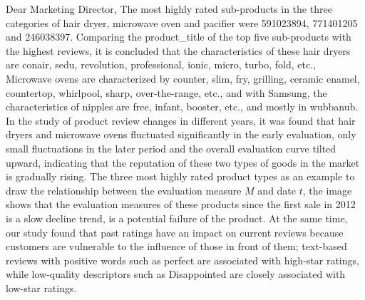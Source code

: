 \documentclass{mcmthesis}
\begin{document}
\begin{letter}{Dear Marketing Director,}
\qquad The most highly rated sub-products in the three categories of hair dryer, microwave oven and pacifier were 591023894, 771401205 and 246038397. Comparing the product\_title of the top five sub-products with the highest reviews, it is concluded that the characteristics of these hair dryers are conair, sedu, revolution, professional, ionic, micro, turbo, fold, etc., Microwave ovens are characterized by counter, slim, fry, grilling, ceramic enamel, countertop, whirlpool, sharp, over-the-range, etc., and with Samsung, the characteristics of nipples are free, infant, booster, etc., and mostly in wubbanub. In the study of product review changes in different years, it was found that hair dryers and microwave ovens fluctuated significantly in the early evaluation, only small fluctuations in the later period and the overall evaluation curve tilted upward, indicating that the reputation of these two types of goods in the market is gradually rising. The three most highly rated product types as an example to draw the relationship between the evaluation measure $ M $ and date $ t $, the image shows that the evaluation measures of these products since the first sale in 2012 is a slow decline trend, is a potential failure of the product. At the same time, our study found that past ratings have an impact on current reviews because customers are vulnerable to the influence of those in front of them; text-based reviews with positive words such as perfect are associated with high-star ratings, while low-quality descriptors such as Disappointed are closely associated with low-star ratings.


\end{letter}
\end{document}
